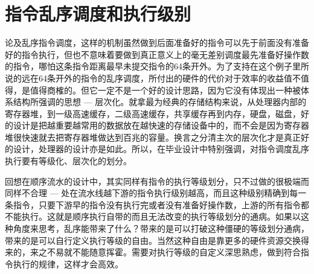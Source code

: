 \section{指令乱序调度和执行级别}\label{subsec:exe_hierarchy}
论及乱序指令调度，这样的机制虽然做到后面准备好的指令可以先于前面没有准备好的指令执行，但也不意味着要做到真正意义上的毫无差别调度最先准备好操作数的指令，哪怕这条指令距离最早未提交指令的64条开外。为了支持在这个例子里所说的远在64条开外的指令的乱序调度，所付出的硬件的代价对于效率的收益值不值得，是值得商榷的。但它一定不是一个好的设计思路，因为它没有体现出一种被体系结构所强调的思想 --- 层次化。就拿最为经典的存储结构来说，从处理器内部的寄存器堆，到一级高速缓存，二级高速缓存，共享缓存再到内存，硬盘，磁盘，好的设计是把越重要越常用的数据放在越快速的存储设备中的，而不会是因为寄存器堆很快速就去把寄存器堆做达到百兆的容量。换言之分清主次的层次化才是真正好的设计，处理器的设计亦是如此。所以，在毕业设计中特别强调，对指令调度乱序执行要有等级化、层次化的划分。

回想在顺序流水的设计中，其实同样有指令的执行等级划分，只不过做的很极端而同样不合理 --- 处在流水线越下游的指令执行级别越高，而且这种级别精确到每一条指令，只要下游早的指令没有执行完或者没有准备好操作数，上游的所有指令都不能执行。这就是顺序执行自带的而且无法改变的执行等级划分的通病。如果以这种角度来思考，乱序能带来了什么？带来的是可以打破这种僵硬的等级划分通病，带来的是可以自行定义执行等级的自由。当然这种自由是靠更多的硬件资源交换得来的，来之不易就不能随意挥霍。需要对执行等级的自定义深思熟虑，做到符合指令执行的规律，这样才会高效。

